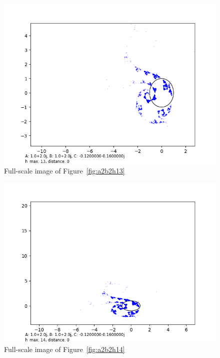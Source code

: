 \documentclass[12pt,a4paper,reqno,parskip=full]{amsart}
\numberwithin{equation}{section}
\theoremstyle{plain}
\theoremstyle{definition}
\begin{document}
\begin{figure}[H]
    \centering
    \includegraphics[width=\textwidth]{images/a2b2/a2,b2,h13,d0.png}
    \caption{Full-scale image of Figure~\ref{fig:a2b2h13}}
\end{figure}

\begin{figure}[H]
    \centering
    \includegraphics[width=\textwidth]{images/a2b2/a2,b2,h14,d0.png}
    \caption{Full-scale image of Figure~\ref{fig:a2b2h14}}
\end{figure}
\end{document}
